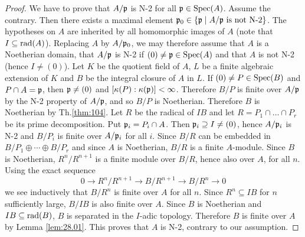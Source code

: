 \documentclass[../main]{subfiles}
\begin{document}
\begin{proof}
We have to prove that $A / \mathfrak{p}$ is N-2 for all $\mathfrak{p} \in \operatorname{Spec}(A)$. Assume the contrary. Then there exists a maximal element $\mathfrak{p}_0\in\{\mathfrak{p}\mid A /\mathfrak{p}\text{ is not N-2}\}$. The hypotheses on $A$ are inherited by all homomorphic images of $A$ (note that\newline $I \subseteq\operatorname{rad}(A)$). Replacing $A$ by $A / \mathfrak{p}_0$, we may therefore assume that $A$ is a Noetherian domain, that $A / \mathfrak{p}$ is N-2 if $(0) \neq \mathfrak{p} \in \operatorname{Spec}(A)$ and that $A$ is not N-2 (hence $I \neq (0)$). Let $K$ be the quotient field of $A$, $L$ be a finite algebraic extension of $K$ and $B$ be the integral closure of $A$ in $L$. If $(0) \neq P \in \operatorname{Spec}(B)$ and $P \cap A=\mathfrak{p}$, then $\mathfrak{p} \neq(0)$ and $[\kappa(P): \kappa(\mathfrak{p})]<\infty$. Therefore $B / P$ is finite over $A / \mathfrak{p}$ by the N-2 property of $A / \mathfrak{p}$, and so $ B / P$ is Noetherian. Therefore $B$ is Noetherian by Th.\ref{thm:104}. Let $R$ be the radical of $I B$ and let $R=P_1 \cap \ldots \cap P_r$ be its prime decomposition. Put $\mathfrak{p}_i=P_i \cap A$. Then $\mathfrak{p}_i \supseteq I \neq(0)$, hence $A / \mathfrak{p}_i$ is N-2 and $B / P_i$ is finite over $A / \mathfrak{p}_i$ for all $i$. Since $B / R$ can be embedded in $B / P_1 \oplus \cdots \oplus B / P_r$ and since $A$ is Noetherian, $B / R$ is a finite $A$-module. Since $B$ is Noetherian, $R^n / R^{n+1}$ is a finite module over $B / R$, hence also over $A$, for all $n$. Using the exact sequence \[0 \longrightarrow R^n / R^{n+1} \longrightarrow B / R^{n+1} \longrightarrow B / R^n \longrightarrow 0\] we see inductively that $B / R^n$ is finite over $A$ for all $n$. Since $R^n\subseteq IB$ for $n$ sufficiently large, $B/IB$ is also finite over $A$. Since $B$ is Noetherian and \newline $IB \subseteq \operatorname{rad}(B)$, $B$ is separated in the $I$-adic topology. Therefore $B$ is finite over $A$ by Lemma \ref{lem:28.01}. This proves that $A$ is N-2, contrary to our assumption.
\end{proof}
\end{document}
